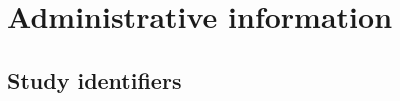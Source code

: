 \documentclass[
]{scrartcl}
\renewcommand*\contentsname{Table of contents}
\newcommand\contentsname{Table of contents}
\begin{document}
\begin{titlepage}
{{{\titlepagetitleblock}
}

\vspace{0.1\textheight}
}

\newcommand{\authorblock}{}

\newcommand{\affiliationblock}{}

\newcommand{\logoblock}{}

\newcommand{\footerblock}{}

\newcommand{\dateblock}{}

\newcommand{\headerblock}{}

\thispagestyle{empty} %


\newlength{\minipagewidth}
\setlength{\minipagewidth}{\textwidth}
\raggedright %
\begin{minipage}[b][\textheight][s]{\minipagewidth}
\titlepagepagealign
\titleblock

\authorblock

\vfill

\logoblock

\footerblock
\par

\end{minipage}
\clearpage
\end{titlepage}
\setcounter{page}{1}

\ifdefined\Shaded\renewenvironment{Shaded}{\begin{tcolorbox}[boxrule=0pt, interior hidden, borderline west={3pt}{0pt}{shadecolor}, breakable, sharp corners, enhanced, frame hidden]}{\end{tcolorbox}}\fi

\renewcommand*\contentsname{Table of contents}
{
\hypersetup{linkcolor=}
\setcounter{tocdepth}{3}
\tableofcontents
}
\newpage{}

\hypertarget{administrative-information}{%
\section{Administrative information}\label{administrative-information}}

\hypertarget{study-identifiers}{%
\subsection{Study identifiers}\label{study-identifiers}}
\end{document}
